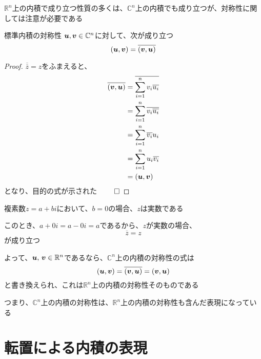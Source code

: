 \documentclass[../../../topic_linear-algebra]{subfiles}
\begin{document}
\sectionline

$\mathbb{R}^n$上の内積で成り立つ性質の多くは、$\mathbb{C}^n$上の内積でも成り立つが、対称性に関しては注意が必要である

\begin{theorem}{標準内積の対称性}\label{thm:standard-inner-product-symmetry}
  $\vb*{u}, \vb*{v} \in \mathbb{C}^n$に対して、次が成り立つ
  \begin{equation*}
    (\vb*{u}, \vb*{v}) = \overline{(\vb*{v}, \vb*{u})}
  \end{equation*}
\end{theorem}

\begin{proof}
  $\overline{\overline{z}} = z$をふまえると、
  \begin{align*}
    \overline{(\vb*{v}, \vb*{u})} & = \overline{\sum_{i=1}^n v_i \overline{u_i}} \\
                                  & = \sum_{i=1}^n \overline{v_i \overline{u_i}} \\
                                  & = \sum_{i=1}^n \overline{v_i} u_i            \\
                                  & = \sum_{i=1}^n u_i \overline{v_i}            \\
                                  & = (\vb*{u}, \vb*{v})
  \end{align*}
  となり、目的の式が示された $\qed$
\end{proof}

複素数$z=a+bi$において、$b=0$の場合、$z$は実数である

このとき、$a+0i = a-0i = a$であるから、$z$が実数の場合、
\begin{equation*}
  \overline{z} = z
\end{equation*}
が成り立つ

\br

よって、$\vb*{u},\,\vb*{v} \in \mathbb{R}^n$であるなら、$\mathbb{C}^n$上の内積の対称性の式は
\begin{equation*}
  (\vb*{u}, \vb*{v}) = \overline{(\vb*{v}, \vb*{u})} = (\vb*{v}, \vb*{u})
\end{equation*}
と書き換えられ、これは$\mathbb{R}^n$上の内積の対称性そのものである

\br

つまり、$\mathbb{C}^n$上の内積の対称性は、$\mathbb{R}^n$上の内積の対称性も含んだ表現になっている

\sectionline
\section{転置による内積の表現}
\end{document}
